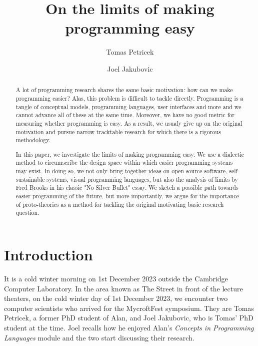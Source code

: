 \documentclass[runningheads]{llncs}
\begin{document}
\title{On the limits of making programming easy}

\author{Tomas Petricek \and
Joel Jakubovic}


\maketitle

\begin{abstract}
A lot of programming research shares the same basic motivation: how can we make programming easier? Alas, this problem is difficult to tackle directly. Programming is a tangle of conceptual models, programming languages, user interfaces and more and we cannot advance all of these at the same time. Moreover, we have no good metric for measuring whether programming is easy. As a result, we usualy give up on the original motivation and pursue narrow tracktable research for which there is a rigorous methodology.

\qquad In this paper, we investigate the limits of making programming easy. We use a dialectic method to circumscribe the design space within which easier programming systems may exist. In doing so, we not only bring together ideas on open-source software, self-sustainable systems, visual programming languages, but also the analysis of limits by Fred Brooks in his classic "No Silver Bullet" essay. We sketch a possible path towards easier programming of the future, but more importantly, we argue for the importance of proto-theories as a method for tackling the original motivating basic research question.

\end{abstract}

\section{Introduction}
It is a cold winter morning on 1st December 2023 outside the Cambridge Computer Laboratory. In the area known as The Street in front of the lecture theaters, on the cold winter day of 1st December 2023, we encounter two computer scientists who arrived for the MycroftFest symposium. They are Tomas Petricek, a former PhD student of Alan, and Joel Jakubovic, who is Tomas' PhD student at the time. Joel recalls how he enjoyed Alan's \emph{Concepts in Programming Languages} module and the two start discussing their research.
\end{document}
